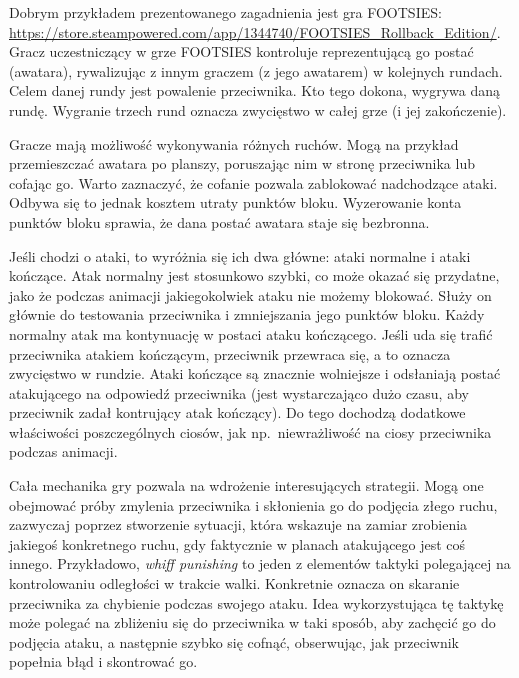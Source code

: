 Dobrym przykładem prezentowanego zagadnienia jest gra FOOTSIES: \url{https://store.steampowered.com/app/1344740/FOOTSIES_Rollback_Edition/}. 
Gracz uczestniczący w grze FOOTSIES kontroluje reprezentującą go postać (awatara), rywalizując z innym graczem (z jego awatarem) w kolejnych rundach. Celem danej rundy jest powalenie przeciwnika. Kto tego dokona, wygrywa daną rundę. Wygranie trzech rund oznacza zwycięstwo w całej grze (i jej zakończenie).

Gracze mają możliwość wykonywania różnych ruchów. Mogą na przykład przemieszczać awatara po planszy, poruszając nim w stronę przeciwnika lub cofając go. Warto zaznaczyć, że cofanie pozwala zablokować nadchodzące ataki. Odbywa się to jednak kosztem utraty punktów bloku. Wyzerowanie konta punktów bloku sprawia, że dana postać awatara staje się bezbronna.

Jeśli chodzi o ataki, to wyróżnia się ich dwa główne: ataki normalne i ataki kończące. Atak normalny jest stosunkowo szybki, co może okazać się przydatne, jako że podczas animacji jakiegokolwiek ataku nie możemy blokować. Służy on głównie do testowania przeciwnika i zmniejszania jego punktów bloku. Każdy normalny atak ma kontynuację w postaci ataku kończącego. Jeśli uda się trafić przeciwnika atakiem kończącym, przeciwnik przewraca się, a to oznacza zwycięstwo w rundzie. Ataki kończące są znacznie wolniejsze i odsłaniają postać atakującego na odpowiedź przeciwnika (jest wystarczająco dużo czasu, aby przeciwnik zadał kontrujący atak kończący). Do tego dochodzą dodatkowe właściwości poszczególnych ciosów, jak np.\ niewrażliwość na ciosy przeciwnika podczas animacji.

Cała mechanika gry pozwala na wdrożenie interesujących strategii. Mogą one obejmować próby zmylenia przeciwnika i skłonienia go do podjęcia złego ruchu, zazwyczaj poprzez stworzenie sytuacji, która wskazuje na zamiar zrobienia jakiegoś konkretnego ruchu, gdy faktycznie w planach atakującego jest coś innego. Przykładowo, \emph{whiff punishing} to jeden z elementów taktyki polegającej na kontrolowaniu odległości w trakcie walki. Konkretnie oznacza on skaranie przeciwnika za chybienie podczas swojego ataku. Idea wykorzystująca tę taktykę może polegać na zbliżeniu się do przeciwnika w taki sposób, aby zachęcić go do podjęcia ataku, a następnie szybko się cofnąć, obserwując, jak przeciwnik popełnia błąd i skontrować go. 

